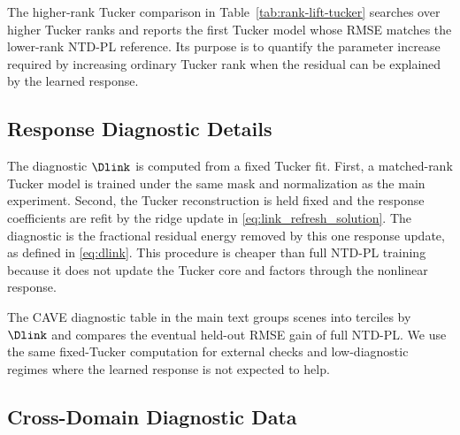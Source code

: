 The higher-rank Tucker comparison in Table~\ref{tab:rank-lift-tucker} searches over
higher Tucker ranks and reports the first Tucker model whose RMSE matches the
lower-rank NTD-PL reference. Its purpose is to quantify the parameter increase
required by increasing ordinary Tucker rank when the residual can be explained
by the learned response.

\subsection{Response Diagnostic Details}
\label{app:diagnostic_details}

The diagnostic $\Dlink$ is computed from a fixed Tucker fit. First, a
matched-rank Tucker model is trained under the same mask and normalization as
the main experiment. Second, the Tucker reconstruction is held fixed and
the response coefficients are refit by the ridge update in
\eqref{eq:link_refresh_solution}. The diagnostic is the fractional residual
energy removed by this one response update, as defined in \eqref{eq:dlink}. This
procedure is cheaper than full NTD-PL training because it does not update the
Tucker core and factors through the nonlinear response.

The CAVE diagnostic table in the main text groups scenes into terciles by
$\Dlink$ and compares the eventual held-out RMSE gain of full NTD-PL. We use
the same fixed-Tucker computation for external checks and low-diagnostic
regimes where the learned response is not expected to help.

\subsection{Cross-Domain Diagnostic Data}
\label{app:cross_domain_details}

